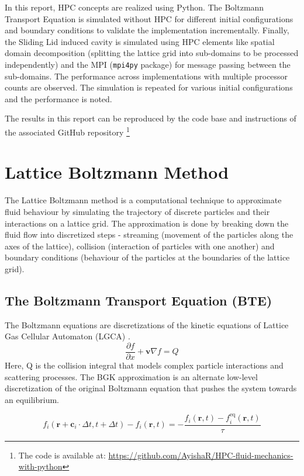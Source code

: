 \documentclass[a4paper,11pt]{report}
\begin{document}
In this report, HPC concepts are realized using Python. The Boltzmann Transport Equation is simulated without HPC for different initial configurations and boundary conditions to validate the implementation incrementally. Finally, the Sliding Lid induced cavity is simulated using HPC elements like spatial domain decomposition (splitting the lattice grid into sub-domains to be processed independently) and the MPI (\texttt{mpi4py} package) for message passing between the sub-domains. The performance across implementations with multiple processor counts are observed. The simulation is repeated for various initial configurations and the performance is noted.

The results in this report can be reproduced by the code base and instructions of the associated GitHub repository \footnote{The code is available at: \url{https://github.com/AyishaR/HPC-fluid-mechanics-with-python}}

\chapter{Lattice Boltzmann Method}
The Lattice Boltzmann method is a computational technique to approximate fluid behaviour by simulating the trajectory of discrete particles and their interactions on a lattice grid. The approximation is done by breaking down the fluid flow into discretized steps - streaming (movement of the particles along the axes of the lattice), collision (interaction of particles with one another) and boundary conditions (behaviour of the particles at the boundaries of the lattice grid).

\section{The Boltzmann Transport Equation (BTE)}
The Boltzmann equations are discretizations of the kinetic equations of Lattice Gas Cellular Automaton (LGCA) \cite{wolf_gladrow_lgca_lbm}.
\begin{equation}
\frac{\partial f}{\partial x} +\mathbf{v}{\nabla f}=Q
\end{equation}
Here, Q is the collision integral that models complex particle interactions and scattering processes. The BGK approximation is an alternate low-level discretization of the original Boltzmann equation that pushes the system towards an equilibrium.

\begin{equation}\label{eq:LBE}
f_i(\mathbf{r}+\mathbf{c}_i\cdot\Delta t,t+\Delta t)-f_i(\mathbf{r},t)=
 -\frac{f_i(\mathbf{r},t)-f_i^\text{eq}(\mathbf{r},t)}  \tau 
\end{equation}
\end{document}

